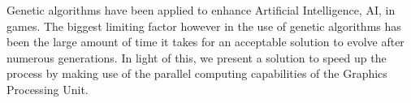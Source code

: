 \begin{thesisabstract}
Genetic algorithms have been applied to enhance Artificial Intelligence, AI, in games. The biggest
limiting factor however in the use of genetic algorithms has been the large amount of 
time it takes for an acceptable solution to evolve after numerous generations.
In light of this, we present a solution to speed up the process by making use of the
parallel computing capabilities of the Graphics Processing Unit.
\end{thesisabstract}